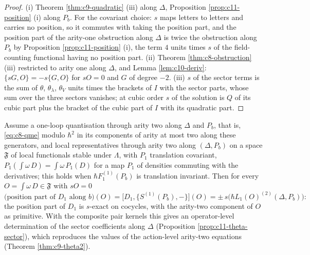 \begin{proof}
(i) Theorem \ref{thm:c9-quadratic} (iii) along $\Delta$, Proposition \ref{prop:c11-position} (i) along $P_b$. For the covariant choice: $s$ maps letters to letters and carries no position, so it commutes with taking the position part, and the position part of the arity-one obstruction along $\Delta$ is twice the obstruction along $P_b$ by Proposition \ref{prop:c11-position} (i), the term $4$ units times $s$ of the field-counting functional having no position part. (ii) Theorem \ref{thm:c8-obstruction} (iii) restricted to arity one along $\Delta$, and Lemma \ref{lem:c10-deriv}: $\{sG,O\}=-s\{G,O\}$ for $sO=0$ and $G$ of degree $-2$. (iii) $s$ of the sector terms is the sum of $\theta$, $\theta_\lambda$, $\theta_V$ units times the brackets of $I$ with the sector parts, whose sum over the three sectors vanishes; at cubic order $s$ of the solution is $Q$ of its cubic part plus the bracket of the cubic part of $I$ with its quadratic part.
\end{proof}

\begin{theorem}
\label{thm:c11-arity2}
Assume a one-loop quantisation through arity two along $\Delta$ and $P_b$, that is, \eqref{eq:c8-qme} modulo $\hbar^2$ in its components of arity at most two along these generators, and local representatives through arity two along $(\Delta,P_b)$ on a space $\mathfrak F$ of local functionals stable under $\Lambda$, with $P_1$ translation covariant, $P_1(\int\omega\,D)=\int\omega\,P_1(D)$ for a map $P_1$ of densities commuting with the derivatives; this holds when $\hbar F_1^{(1)}(P_b)$ is translation invariant. Then for every $O=\int\omega\,D\in\mathfrak F$ with $sO=0$
\[
\big(\text{position part of }D_1\text{ along }b\big)(O)=\big[D_1,\{S^{(1)}(P_b),-\}\big](O)=\pm\,s\Big(\hbar L_1(O)^{(2)}(\Delta,P_b)\Big):
\]
the position part of $D_1$ is $s$-exact on cocycles, with the arity-two component of $O$ as primitive. With the composite pair kernels this gives an operator-level determination of the sector coefficients along $\Delta$ (Proposition \ref{prop:c11-theta-sector}), which reproduces the values of the action-level arity-two equations (Theorem \ref{thm:c9-theta2}).
\end{theorem}

